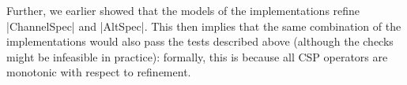Further, we earlier showed that the models of the implementations refine
|ChannelSpec| and |AltSpec|.  This then implies that the same combination of
the implementations would also pass the tests described above (although the
checks might be infeasible in practice): formally, this is because all CSP
operators are monotonic with respect to refinement.





